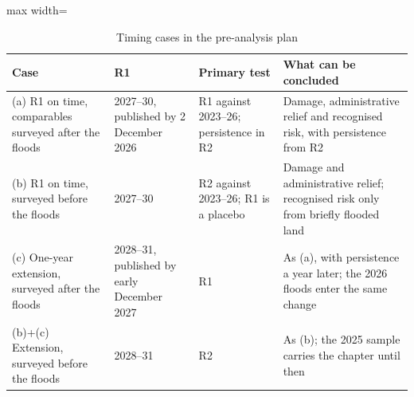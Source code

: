 \begin{table}[h]
\centering\footnotesize
\caption{Timing cases in the pre-analysis plan}\label{tab:timing}
\begin{adjustbox}{max width=\textwidth}
\begin{tabular}{p{3.4cm}p{3.2cm}p{3.4cm}p{5.4cm}}
\toprule
Case & R1 & Primary test & What can be concluded \\
\midrule
(a) R1 on time, comparables surveyed after the floods & 2027--30, published by 2 December 2026 & R1 against 2023--26; persistence in R2 & Damage, administrative relief and recognised risk, with persistence from R2 \\
(b) R1 on time, surveyed before the floods & 2027--30 & R2 against 2023--26; R1 is a placebo & Damage and administrative relief; recognised risk only from briefly flooded land \\
(c) One-year extension, surveyed after the floods & 2028--31, published by early December 2027 & R1 & As (a), with persistence a year later; the 2026 floods enter the same change \\
(b)+(c) Extension, surveyed before the floods & 2028--31 & R2 & As (b); the 2025 sample carries the chapter until then \\
\bottomrule
\end{tabular}
\end{adjustbox}
\end{table}
